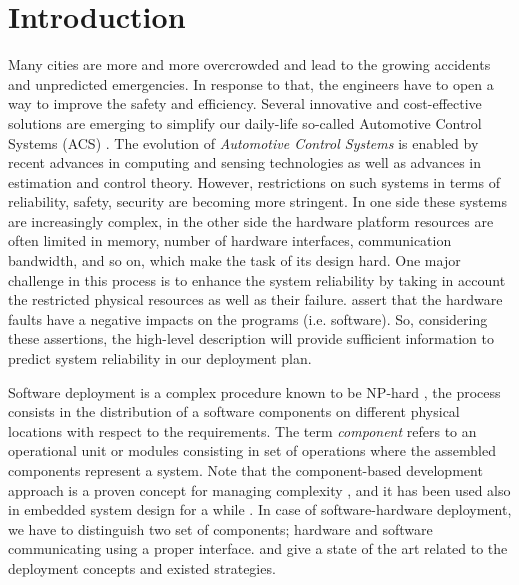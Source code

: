 \documentclass[3p,times,procedia,authoryear,round]{elsarticle}
\begin{document}

\section{Introduction}
\label{Introduction}

Many cities are more and more overcrowded and lead to the growing accidents and unpredicted emergencies. In response to that, the engineers have to open a way to improve the safety and efficiency. Several innovative and cost-effective solutions are emerging to simplify our daily-life so-called Automotive Control Systems (ACS) \citep{Reif2014}. The evolution of \emph{ Automotive Control Systems} is enabled by recent advances in computing and sensing technologies as well as advances in estimation and control theory. However, restrictions on such systems in terms of reliability, safety, security are becoming more stringent. In one side these systems are increasingly complex, in the other side the hardware platform resources are often limited in memory, number of hardware interfaces, communication bandwidth, and so on, which make the task of its design hard. One major challenge in this process is to enhance the system reliability by taking in account the restricted physical resources as well as their failure. \citep{Rashid6933951} assert that the hardware faults have a negative impacts on the programs (i.e. software). So, considering these assertions, the high-level description will provide sufficient information to predict system reliability in our deployment plan.

Software deployment is a complex procedure known to be NP-hard \citep{Garey1979}, the process consists in the distribution of a software components on different physical locations with respect to the requirements. The term \emph{component} refers to an operational unit or modules consisting in set of operations where the assembled components represent a system. Note that the component-based development approach is a proven concept for managing complexity \citep{Carlson2006127}, and it has been used also in embedded system design for a while \citep{Herrera201455}. In case of software-hardware deployment, we have to distinguish two set of components; hardware and software communicating using a proper interface. \citep{Arcangeli2015198} and \citep{5934806} give a state of the art related to the deployment concepts and existed strategies.  
\end{document}
